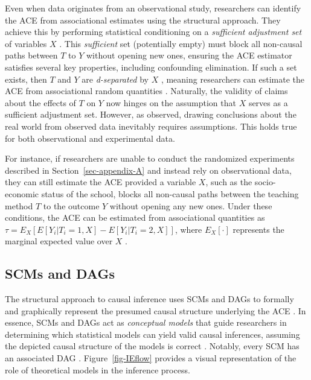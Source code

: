 \documentclass[
  authoryear,
  review,
  1p]{elsarticle}
\begin{document}
Even when data originates from an observational study, researchers can
identify the ACE from associational estimates using the structural
approach. They achieve this by performing statistical conditioning on a
\emph{sufficient adjustment set} of variables \(X\)
\citep{Pearl_2009, Pearl_et_al_2016, Morgan_et_al_2014}. This
\emph{sufficient} set (potentially empty) must block all non-causal
paths between \(T\) to \(Y\) without opening new ones, ensuring the ACE
estimator satisfies several key properties, including confounding
elimination. If such a set exists, then \(T\) and \(Y\) are
\emph{d-separated} by \(X\) \citep{Pearl_2009}, meaning researchers can
estimate the ACE from associational random quantities
\citep{Morgan_et_al_2014}. Naturally, the validity of claims about the
effects of \(T\) on \(Y\) now hinges on the assumption that \(X\) serves
as a sufficient adjustment set. However, as
\citet[pp.~150]{Kohler_et_al_2019} observed, drawing conclusions about
the real world from observed data inevitably requires assumptions. This
holds true for both observational and experimental data.

For instance, if researchers are unable to conduct the randomized
experiments described in Section~\ref{sec-appendix-A} and instead rely
on observational data, they can still estimate the ACE provided a
variable \(X\), such as the socio-economic status of the school, blocks
all non-causal paths between the teaching method \(T\) to the outcome
\(Y\) without opening any new ones. Under these conditions, the ACE can
be estimated from associational quantities as
\(\tau = E_{X}\left[ E[Y_{i}| T_{i}=1, X] - E[Y_{i}| T_{i}=2, X] \right]\),
where \(E_{X}[\cdot]\) represents the marginal expected value over \(X\)
\citep{Morgan_et_al_2014}.

\subsection{SCMs and DAGs}\label{sec-appendix-C}

\newcommand{\dsep}{\perp\!\!\!\perp}
\newcommand{\ndsep}{\not\!\perp\!\!\!\perp}

The structural approach to causal inference uses SCMs and DAGs to
formally and graphically represent the presumed causal structure
underlying the ACE
\citep{Pearl_2009, Pearl_et_al_2016, Gross_et_al_2018, Neal_2020}. In
essence, SCMs and DAGs act as \emph{conceptual models} that guide
researchers in determining which statistical models can yield valid
causal inferences, assuming the depicted causal structure of the models
is correct \citep{McElreath_2020}. Notably, every SCM has an associated
DAG \citep{Cinelli_et_al_2020}. Figure~\ref{fig-IEflow} provides a
visual representation of the role of theoretical models in the inference
process.
\end{document}
